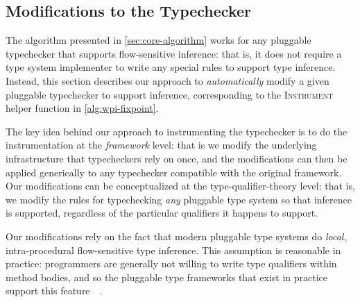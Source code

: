 \subsection{Modifications to the Typechecker}
\label{sec:instrument}

The algorithm presented in \cref{sec:core-algorithm} works for
any pluggable typechecker that supports flow-sensitive inference:
that is, it does not require a type system implementer to write
any special rules to support type inference. Instead, this section
describes our approach to \emph{automatically} modify a given
pluggable typechecker to support inference, corresponding to the
\textsc{Instrument} helper function in \cref{alg:wpi-fixpoint}.

The key idea behind our approach to instrumenting the typechecker
is to do the instrumentation at the \emph{framework} level: that is
we modify the underlying infrastructure that typecheckers rely on
once, and the modifications can then be applied generically to any
typechecker compatible with the original framework. Our modifications
can be conceptualized at the type-qualifier-theory level: that is,
we modify the rules for typechecking \emph{any} pluggable type system
so that inference is supported,
regardless of the particular qualifiers it happens to support.

Our modifications rely on the fact that modern pluggable type systems
do \emph{local}, intra-procedural flow-sensitive type inference. This assumption is
reasonable in practice: programmers are generally not willing to
write type qualifiers within method bodies, and so 
the pluggable type frameworks that exist in practice 
support this feature~\cite{PapiACPE2008}~.  

